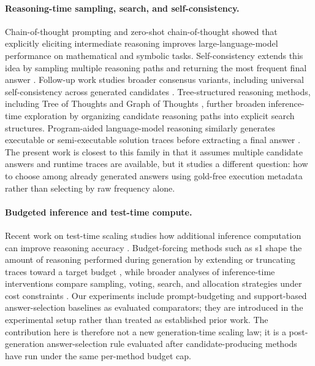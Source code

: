 \documentclass[smallcondensed]{svjour3}
\begin{document}
\paragraph{Reasoning-time sampling, search, and self-consistency.}
Chain-of-thought prompting \citep{wei2022chain} and zero-shot chain-of-thought \citep{kojima2022large} showed that explicitly eliciting intermediate reasoning improves large-language-model performance on mathematical and symbolic tasks.
Self-consistency extends this idea by sampling multiple reasoning paths and returning the most frequent final answer \citep{wang2023selfconsistency}.
Follow-up work studies broader consensus variants, including universal self-consistency across generated candidates \citep{chen2023universalselfconsistency}.
Tree-structured reasoning methods, including Tree of Thoughts \citep{yao2023tree} and Graph of Thoughts \citep{besta2024graph}, further broaden inference-time exploration by organizing candidate reasoning paths into explicit search structures.
Program-aided language-model reasoning similarly generates executable or semi-executable solution traces before extracting a final answer \citep{gao2023pal}.
The present work is closest to this family in that it assumes multiple candidate answers and runtime traces are available, but it studies a different question: how to choose among already generated answers using gold-free execution metadata rather than selecting by raw frequency alone.

\paragraph{Budgeted inference and test-time compute.}
Recent work on test-time scaling studies how additional inference computation can improve reasoning accuracy \citep{snell2024scaling}.
Budget-forcing methods such as s1 shape the amount of reasoning performed during generation by extending or truncating traces toward a target budget \citep{muennighoff2025s1}, while broader analyses of inference-time interventions compare sampling, voting, search, and allocation strategies under cost constraints \citep{wu2024inference}.
Our experiments include prompt-budgeting and support-based answer-selection baselines as evaluated comparators; they are introduced in the experimental setup rather than treated as established prior work.
The contribution here is therefore not a new generation-time scaling law; it is a post-generation answer-selection rule evaluated after candidate-producing methods have run under the same per-method budget cap.
\end{document}
